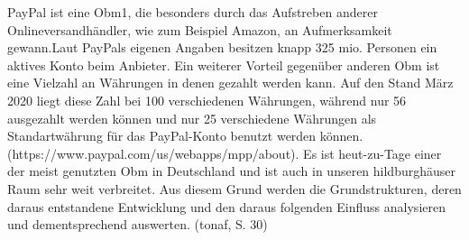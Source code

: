  
PayPal ist eine Obm1, die besonders durch das Aufstreben anderer Onlineversandhändler, wie zum Beispiel Amazon, an Aufmerksamkeit gewann.Laut PayPals eigenen Angaben besitzen knapp 325 mio. Personen ein aktives Konto beim Anbieter. Ein weiterer Vorteil gegenüber anderen Obm ist eine Vielzahl an Währungen in denen gezahlt werden kann. Auf den Stand März 2020 liegt diese Zahl bei 100 verschiedenen Währungen, während nur 56 ausgezahlt werden können und nur 25 verschiedene Währungen als Standartwährung für das PayPal-Konto benutzt werden können. (https://www.paypal.com/us/webapps/mpp/about). Es ist heut-zu-Tage einer der meist genutzten  Obm in Deutschland und ist auch in unseren hildburghäuser Raum sehr weit verbreitet. Aus diesem Grund werden die Grundstrukturen, deren daraus entstandene Entwicklung und den daraus folgenden Einfluss analysieren und dementsprechend auswerten. (tonaf, S. 30)
